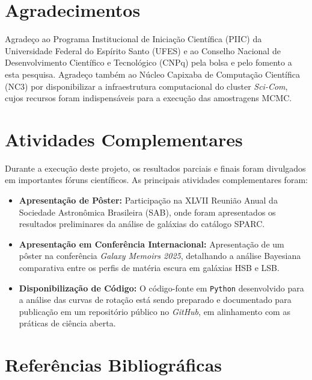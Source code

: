 \documentclass[a4paper]{article}
\begin{document}
\section{Agradecimentos}
Agradeço ao Programa Institucional de Iniciação Científica (PIIC) da Universidade Federal do Espírito Santo (UFES) e ao Conselho Nacional de Desenvolvimento Científico e Tecnológico (CNPq) pela bolsa e pelo fomento a esta pesquisa. Agradeço também ao Núcleo Capixaba de Computação Científica (NC3) por disponibilizar a infraestrutura computacional do cluster \textit{Sci-Com}, cujos recursos foram indispensáveis para a execução das amostragens MCMC.

\section{Atividades Complementares}
Durante a execução deste projeto, os resultados parciais e finais foram divulgados em importantes fóruns científicos. As principais atividades complementares foram:
\begin{itemize}
    \item \textbf{Apresentação de Pôster:} Participação na XLVII Reunião Anual da Sociedade Astronômica Brasileira (SAB), onde foram apresentados os resultados preliminares da análise de galáxias do catálogo SPARC.
    \item \textbf{Apresentação em Conferência Internacional:} Apresentação de um pôster na conferência \textit{Galaxy Memoirs 2025}, detalhando a análise Bayesiana comparativa entre os perfis de matéria escura em galáxias HSB e LSB.
    \item \textbf{Disponibilização de Código:} O código-fonte em \texttt{Python} desenvolvido para a análise das curvas de rotação está sendo preparado e documentado para publicação em um repositório público no \textit{GitHub}, em alinhamento com as práticas de ciência aberta.
\end{itemize}

\section*{Referências Bibliográficas}

\end{document}
